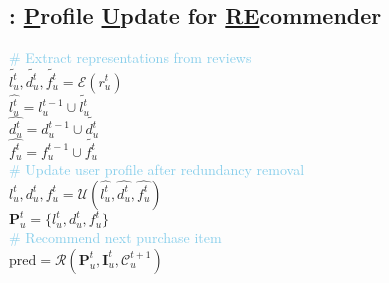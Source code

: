 

\subsection{\myalg{}: \underline{P}rofile \underline{U}pdate for \underline{RE}commender}

\begingroup
\setlength{\textfloatsep}{8pt}
\begin{algorithm}[t]
    \DontPrintSemicolon
    \SetAlgoLined
    \SetNoFillComment
    \LinesNotNumbered 
    \caption{\myalg{}}
    \label{alg:main}
    {\small{\textcolor{Skyblue}{\# Extract representations from reviews}}}\\
    $\tilde{l_u^t}, \tilde{d_u^t}, \tilde{f_u^t} = \mathcal{E}(r_u^t)$\\
    $\hat{l_u^t} = l_u^{t-1} \cup \tilde{l_u^t}$ \quad{\small{\textcolor{Skyblue}{$\triangleright$ List of items user likes}}}\\
    $ \hat{d_u^t} = d_u^{t-1} \cup \tilde{d_u^t} $  \quad{\small{\textcolor{Skyblue}{$\triangleright$ List of items user dislikes}}}\\
    $\hat{f_u^t} = f_u^{t-1} \cup \tilde{f_u^t}$  \quad{\small{\textcolor{Skyblue}{$\triangleright$ List of user's key features}}}\\
    
    {\small{\textcolor{Skyblue}{\# Update user profile after redundancy removal}}}\\
    $l_u^t, d_u^t, f_u^t = \mathcal{U}(\hat{l_u^t}, \hat{d_u^t}, \hat{f_u^t})$ \\
    $\mathbf{P}_u^t = \{l_u^t, d_u^t, f_u^t\}$\\
    
    {\small{\textcolor{Skyblue}{\# Recommend next purchase item}}}\\
    $\mathrm{pred} = \mathcal{R}(\mathbf{P}_u^t, \mathbf{I}_u^t, \mathcal{C}_u^{t+1})$ \\

    

\end{algorithm}



